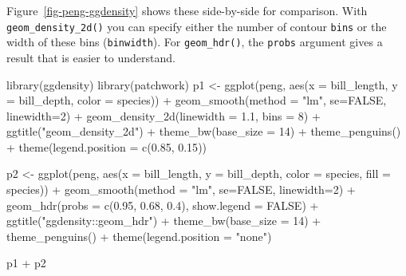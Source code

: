 \documentclass[
  letterpaper,
  10pt,
  krantz2]{krantz}
\makeatletter
\newenvironment{Shaded}{\begin{snugshade}}{\end{snugshade}}
\newcommand{\AttributeTok}[1]{\textcolor[rgb]{0.40,0.45,0.13}{#1}}
\newcommand{\ConstantTok}[1]{\textcolor[rgb]{0.56,0.35,0.01}{#1}}
\newcommand{\DecValTok}[1]{\textcolor[rgb]{0.68,0.00,0.00}{#1}}
\newcommand{\FloatTok}[1]{\textcolor[rgb]{0.68,0.00,0.00}{#1}}
\newcommand{\FunctionTok}[1]{\textcolor[rgb]{0.28,0.35,0.67}{#1}}
\newcommand{\NormalTok}[1]{\textcolor[rgb]{0.00,0.23,0.31}{#1}}
\newcommand{\OtherTok}[1]{\textcolor[rgb]{0.00,0.23,0.31}{#1}}
\newcommand{\SpecialCharTok}[1]{\textcolor[rgb]{0.37,0.37,0.37}{#1}}
\newcommand{\StringTok}[1]{\textcolor[rgb]{0.13,0.47,0.30}{#1}}
\newenvironment{kframe}{%
  \medskip{}
  \setlength{\fboxsep}{.8em}
  \def\at@end@of@kframe{}%
  \ifinner\ifhmode%
  \def\at@end@of@kframe{\end{minipage}}%
  \begin{minipage}{\columnwidth}%
  \fi\fi%
  \def\FrameCommand##1{\hskip\@totalleftmargin \hskip-\fboxsep
  \colorbox{shadecolor}{##1}\hskip-\fboxsep
      \hskip-\linewidth \hskip-\@totalleftmargin \hskip\columnwidth}%
  \MakeFramed {\advance\hsize-\width
    \@totalleftmargin\z@ \linewidth\hsize
    \@setminipage}}%
{\par\unskip\endMakeFramed%
  \at@end@of@kframe}
\renewenvironment{Shaded}{\begin{kframe}}{\end{kframe}}
\makeatother
\begin{document}
Figure~\ref{fig-peng-ggdensity} shows these side-by-side for comparison.
With \texttt{geom\_density\_2d()} you can specify either the number of
contour \texttt{bins} or the width of these bins (\texttt{binwidth}).
For \texttt{geom\_hdr()}, the \texttt{probs} argument gives a result
that is easier to understand.

\begin{Shaded}
\begin{Highlighting}[]
\FunctionTok{library}\NormalTok{(ggdensity)}
\FunctionTok{library}\NormalTok{(patchwork)}
\NormalTok{p1 }\OtherTok{\textless{}{-}} \FunctionTok{ggplot}\NormalTok{(peng, }
       \FunctionTok{aes}\NormalTok{(}\AttributeTok{x =}\NormalTok{ bill\_length, }\AttributeTok{y =}\NormalTok{ bill\_depth,}
           \AttributeTok{color =}\NormalTok{ species)) }\SpecialCharTok{+}
  \FunctionTok{geom\_smooth}\NormalTok{(}\AttributeTok{method =} \StringTok{"lm"}\NormalTok{,  }\AttributeTok{se=}\ConstantTok{FALSE}\NormalTok{, }\AttributeTok{linewidth=}\DecValTok{2}\NormalTok{) }\SpecialCharTok{+}
  \FunctionTok{geom\_density\_2d}\NormalTok{(}\AttributeTok{linewidth =} \FloatTok{1.1}\NormalTok{, }\AttributeTok{bins =} \DecValTok{8}\NormalTok{) }\SpecialCharTok{+}
  \FunctionTok{ggtitle}\NormalTok{(}\StringTok{"geom\_density\_2d"}\NormalTok{) }\SpecialCharTok{+}
  \FunctionTok{theme\_bw}\NormalTok{(}\AttributeTok{base\_size =} \DecValTok{14}\NormalTok{) }\SpecialCharTok{+} 
  \FunctionTok{theme\_penguins}\NormalTok{() }\SpecialCharTok{+}
  \FunctionTok{theme}\NormalTok{(}\AttributeTok{legend.position =} \FunctionTok{c}\NormalTok{(}\FloatTok{0.85}\NormalTok{, }\FloatTok{0.15}\NormalTok{))}

\NormalTok{p2 }\OtherTok{\textless{}{-}} \FunctionTok{ggplot}\NormalTok{(peng, }
       \FunctionTok{aes}\NormalTok{(}\AttributeTok{x =}\NormalTok{ bill\_length, }\AttributeTok{y =}\NormalTok{ bill\_depth,}
           \AttributeTok{color =}\NormalTok{ species, }\AttributeTok{fill =}\NormalTok{ species)) }\SpecialCharTok{+}
  \FunctionTok{geom\_smooth}\NormalTok{(}\AttributeTok{method =} \StringTok{"lm"}\NormalTok{,  }\AttributeTok{se=}\ConstantTok{FALSE}\NormalTok{, }\AttributeTok{linewidth=}\DecValTok{2}\NormalTok{) }\SpecialCharTok{+}
  \FunctionTok{geom\_hdr}\NormalTok{(}\AttributeTok{probs =} \FunctionTok{c}\NormalTok{(}\FloatTok{0.95}\NormalTok{, }\FloatTok{0.68}\NormalTok{, }\FloatTok{0.4}\NormalTok{), }\AttributeTok{show.legend =} \ConstantTok{FALSE}\NormalTok{) }\SpecialCharTok{+}
  \FunctionTok{ggtitle}\NormalTok{(}\StringTok{"ggdensity::geom\_hdr"}\NormalTok{) }\SpecialCharTok{+}
  \FunctionTok{theme\_bw}\NormalTok{(}\AttributeTok{base\_size =} \DecValTok{14}\NormalTok{) }\SpecialCharTok{+}
  \FunctionTok{theme\_penguins}\NormalTok{() }\SpecialCharTok{+}
  \FunctionTok{theme}\NormalTok{(}\AttributeTok{legend.position =} \StringTok{"none"}\NormalTok{)}

\NormalTok{p1 }\SpecialCharTok{+}\NormalTok{ p2}
\end{Highlighting}
\end{Shaded}
\end{document}
